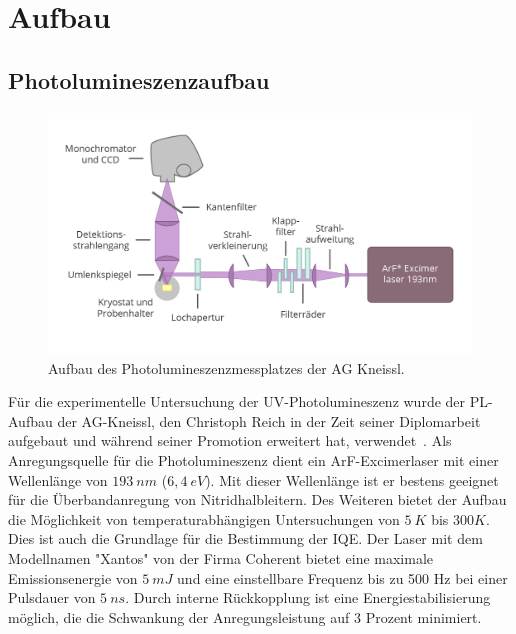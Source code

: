 
\chapter{Aufbau}


\thispagestyle{fancy}

\section{Photolumineszenzaufbau}
\begin{figure}[!htb]
    \centering
    \begin{minipage}[t]{\linewidth}
        \centering
        \includegraphics[width=0.8\linewidth]{Bilder/aufbauPL.png}
        \caption{Aufbau des Photolumineszenzmessplatzes der AG Kneissl. }
        \label{fig:wurtz}
    \end{minipage}%
\end{figure}
\noindent
Für die experimentelle Untersuchung der UV-Photolumineszenz wurde der PL-Aufbau der AG-Kneissl, den Christoph Reich in der Zeit seiner Diplomarbeit aufgebaut und während seiner Promotion erweitert hat, verwendet~\cite{creich}. 
Als Anregungsquelle für die Photolumineszenz dient ein ArF-Excimerlaser mit einer Wellenlänge von $193 \ nm$ ($6,4 \ eV$). Mit dieser Wellenlänge ist er bestens geeignet für die Überbandanregung von Nitridhalbleitern. 
Des Weiteren bietet der Aufbau die Möglichkeit von temperaturabhängigen Untersuchungen von $5 \ K $ bis $300 K$. Dies ist auch die Grundlage für die Bestimmung der IQE. 
\newline
Der Laser mit dem Modellnamen "Xantos" von der Firma Coherent bietet eine maximale Emissionsenergie von $ 5 \ mJ $ und eine einstellbare Frequenz bis zu 500 Hz bei einer Pulsdauer von $5 \ ns$. 
Durch interne Rückkopplung ist eine Energiestabilisierung möglich, die die Schwankung der Anregungsleistung auf 3 Prozent minimiert. 
\newline

